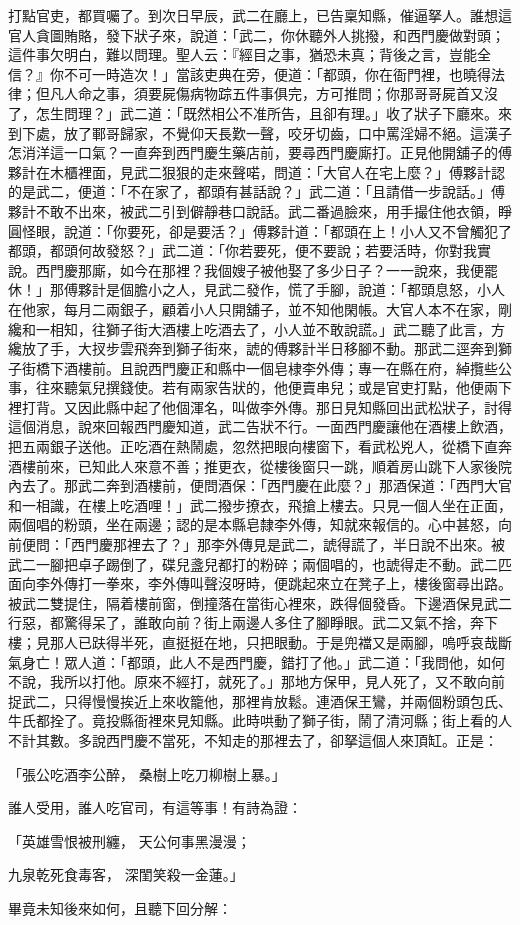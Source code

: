 \begin{showcontents}{}
打點官吏，都買囑了。到次日早辰，武二在廳上，已告稟知縣，催逼拏人。誰想這官人貪圖賄賂，發下狀子來，說道：「武二，你休聽外人挑撥，和西門慶做對頭；這件事欠明白，難以問理。聖人云：『經目之事，猶恐未真；背後之言，豈能全信？』你不可一時造次！」當該吏典在旁，便道：「都頭，你在衙門裡，也曉得法律；但凡人命之事，須要屍傷病物踪五件事俱完，方可推問；你那哥哥屍首又沒了，怎生問理？」武二道：「既然相公不准所告，且卻有理。」收了狀子下廳來。來到下處，放了鄆哥歸家，不覺仰天長歎一聲，咬牙切齒，口中罵淫婦不絕。這漢子怎消洋這一口氣？一直奔到西門慶生藥店前，要尋西門慶廝打。正見他開舖子的傅夥計在木櫃裡面，見武二狠狠的走來聲喏，問道：「大官人在宅上麼？」傅夥計認的是武二，便道：「不在家了，都頭有甚話說？」武二道：「且請借一步說話。」傅夥計不敢不出來，被武二引到僻靜巷口說話。武二番過臉來，用手撮住他衣領，睜圓怪眼，說道：「你要死，卻是要活？」傅夥計道：「都頭在上！小人又不曾觸犯了都頭，都頭何故發怒？」武二道：「你若要死，便不要說；若要活時，你對我實說。西門慶那廝，如今在那裡？我個嫂子被他娶了多少日子？一一說來，我便罷休！」那傅夥計是個膽小之人，見武二發作，慌了手腳，說道：「都頭息怒，小人在他家，每月二兩銀子，顧着小人只開舖子，並不知他閑帳。大官人本不在家，剛纔和一相知，往獅子街大酒樓上吃酒去了，小人並不敢說謊。」武二聽了此言，方纔放了手，大扠步雲飛奔到獅子街來，諕的傅夥計半日移腳不動。那武二逕奔到獅子街橋下酒樓前。且說西門慶正和縣中一個皂棣李外傳；專一在縣在府，綽攬些公事，往來聽氣兒撰錢使。若有兩家告狀的，他便賣串兒；或是官吏打點，他便兩下裡打背。又因此縣中起了他個渾名，叫做李外傳。那日見知縣回出武松狀子，討得這個消息，說來回報西門慶知道，武二告狀不行。一面西門慶讓他在酒樓上飲酒，把五兩銀子送他。正吃酒在熱鬧處，忽然把眼向樓窗下，看武松兇人，從橋下直奔酒樓前來，已知此人來意不善；推更衣，從樓後窗只一跳，順着房山跳下人家後院內去了。那武二奔到酒樓前，便問酒保：「西門慶在此麼？」那酒保道：「西門大官和一相識，在樓上吃酒哩！」武二撥步撩衣，飛搶上樓去。只見一個人坐在正面，兩個唱的粉頭，坐在兩邊；認的是本縣皂隸李外傳，知就來報信的。心中甚怒，向前便問：「西門慶那裡去了？」那李外傳見是武二，諕得謊了，半日說不出來。被武二一腳把卓子踢倒了，碟兒盞兒都打的粉碎；兩個唱的，也諕得走不動。武二匹面向李外傳打一拳來，李外傳叫聲沒呀時，便跳起來立在凳子上，樓後窗尋出路。被武二雙提住，隔着樓前窗，倒撞落在當街心裡來，跌得個發昏。下邊酒保見武二行惡，都驚得呆了，誰敢向前？街上兩邊人多住了腳睜眼。武二又氣不捨，奔下樓；見那人已趺得半死，直挺挺在地，只把眼動。于是兜襠又是兩腳，嗚呼哀哉斷氣身亡！眾人道：「都頭，此人不是西門慶，錯打了他。」武二道：「我問他，如何不說，我所以打他。原來不經打，就死了。」那地方保甲，見人死了，又不敢向前捉武二，只得慢慢挨近上來收籠他，那裡肯放鬆。連酒保王鸞，并兩個粉頭包氏、牛氏都拴了。竟投縣衙裡來見知縣。此時哄動了獅子街，鬧了清河縣；街上看的人不計其數。多說西門慶不當死，不知走的那裡去了，卻拏這個人來頂缸。正是：

「張公吃酒李公醉，  桑樹上吃刀柳樹上暴。」

誰人受用，誰人吃官司，有這等事！有詩為證：

「英雄雪恨被刑纏，  天公何事黑漫漫；

九泉乾死食毒客，  深閨笑殺一金蓮。」

畢竟未知後來如何，且聽下回分解：




\end{showcontents}
